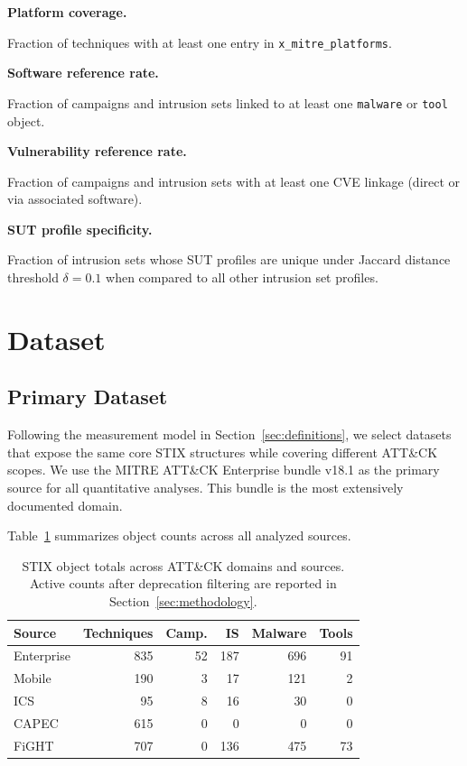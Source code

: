 \documentclass[sigconf,anonymous,review]{acmart}
\newcommand{\mitre}{MITRE\xspace}
\newcommand{\attack}{ATT\&CK\xspace}
\newcommand{\myparagraph}[1]{\textbf{#1.}\hspace{0.5em}}
\begin{document}
\myparagraph{Platform coverage}

Fraction of techniques with at least one entry in \texttt{x\_mitre\_platforms}.

\myparagraph{Software reference rate}

Fraction of campaigns and intrusion sets linked to at least one \texttt{malware} or \texttt{tool} object.

\myparagraph{Vulnerability reference rate}

Fraction of campaigns and intrusion sets with at least one CVE linkage (direct or via associated software).

\myparagraph{SUT profile specificity}

Fraction of intrusion sets whose SUT profiles are unique under Jaccard distance threshold $\delta = 0.1$ when compared to all other intrusion set profiles.


\section{Dataset}\label{sec:dataset}

\subsection{Primary Dataset}

Following the measurement model in Section~\ref{sec:definitions}, we select datasets that expose the same core STIX structures while covering different ATT\&CK scopes. We use the \mitre{} \attack{} Enterprise bundle v18.1 as the primary source for all quantitative analyses. This bundle is the most extensively documented domain.

Table~\ref{tab:dataset} summarizes object counts across all analyzed sources.

\begin{table}[!htb]
\caption{STIX object totals across ATT\&CK domains and sources. Active counts after deprecation filtering are reported in Section~\ref{sec:methodology}.}\label{tab:dataset}
\centering\small
\begin{tabular}{lrrrrr}
\toprule
\textbf{Source} &
\textbf{Techniques} &
\textbf{Camp.} &
\textbf{IS} &
\textbf{Malware} &
\textbf{Tools} \\
\midrule
Enterprise & 835 & 52  & 187 & 696 & 91 \\
Mobile     & 190 & 3   & 17  & 121 & 2  \\
ICS        & 95  & 8   & 16  & 30  & 0  \\
CAPEC      & 615 & 0   & 0   & 0   & 0 \\
FiGHT      & 707 & 0   & 136 & 475 & 73 \\
\bottomrule
\end{tabular}
\end{table}
\end{document}
